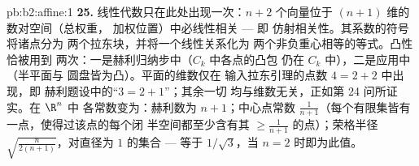 \begin{solution}{pb:b2:affine:1}
\textbf{25.} 线性代数只在此处出现一次：$n + 2$ 个向量位于
$(n+1)$ 维的数对空间（总权重，
加权位置）中必线性相关 --- 即
仿射相关性。其系数的符号将诸点分为
两个拉东块，并将一个线性关系化为
两个非负重心相等的等式。凸性恰被用到
两次：一是赫利归纳步中（$C_k$ 中各点的凸包
仍在 $C_k$ 中），二是应用中（半平面与
圆盘皆为凸）。平面的维数仅在
输入拉东引理的点数 $4 = 2 + 2$ 中出现，即
赫利题设中的“$3 = 2 + 1$”；其余一切
均与维数无关，正如第 24 问所证实。在 $\R^n$ 中
各常数变为：赫利数为 $n + 1$；中心点常数
$\frac1{n+1}$（每个有限集皆有一点，使得过该点的每个闭
半空间都至少含有其 $\geq
\frac1{n+1}$ 的点）；荣格半径
$\sqrt{\frac{n}{2(n+1)}}$，对直径为 $1$ 的集合 --- 等于
$1/\sqrt3$，当 $n = 2$ 时即为此值。
\end{solution}
